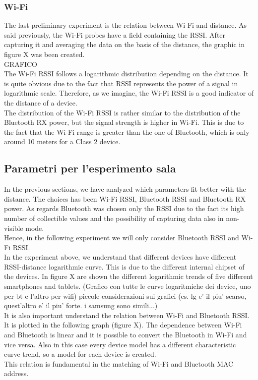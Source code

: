 \subsubsection{Wi-Fi}
The last preliminary experiment is the relation between Wi-Fi and distance. As said previously, the Wi-Fi probes have a field containing the RSSI. After capturing it and averaging the data on the basis of the distance, the graphic in figure X was been created.\\GRAFICO\\
The Wi-Fi RSSI follows a logarithmic distribution depending on the distance. It is quite obvious due to the fact that RSSI represents the power of a signal in logarithmic scale. Therefore, as we imagine, the Wi-Fi RSSI is a good indicator of the distance of a device.\\
The distribution of the Wi-Fi RSSI is rather similar to the distribution of the Bluetooth RX power, but the signal strength is higher in Wi-Fi. This is due to the fact that the Wi-Fi range is greater than the one of Bluetooth, which is only around 10 meters for a Class 2 device.


\subsection{Parametri per l'esperimento sala}
In the previous sections, we have analyzed which parameters fit better with the distance. The choices has been Wi-Fi RSSI, Bluetooth RSSI and Bluetooth RX power. As regards Bluetooth was chosen only the RSSI due to the fact its high number of collectible values and the possibility of capturing data also in non-visible mode.\\
Hence, in the following experiment we will only consider Bluetooth RSSI and Wi-Fi RSSI.\\
In the experiment above, we understand that different devices have different RSSI-distance logarithmic curve. This is due to the different internal chipset of the devices. In figure X are shown the different logarithmic trends of five different smartphones and tablets. (Grafico con tutte le curve logaritmiche dei device, uno per bt e l'altro per wifi) piccole considerazioni sui grafici (es. lg e' il piu' scarso, quest'altro e' il piu' forte. i samsung sono simili...)\\
\linebreak
It is also important understand the relation between Wi-Fi and Bluetooth RSSI. It is plotted in the following graph (figure X). The dependence between Wi-Fi and Bluetooth is linear and it is possible to convert the Bluetooth in Wi-Fi and vice versa. Also in this case every device model has a different characteristic curve trend, so a model for each device is created.\\
This relation is fundamental in the matching of Wi-Fi and Bluetooth MAC address.
